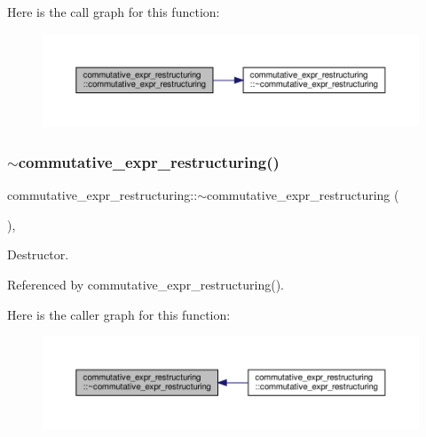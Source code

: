 Here is the call graph for this function\+:
\nopagebreak
\begin{figure}[H]
\begin{center}
\leavevmode
\includegraphics[width=350pt]{db/d8c/classcommutative__expr__restructuring_aa4c5653385cc2917ada9cf5ee3936cd3_cgraph}
\end{center}
\end{figure}
\mbox{\label{classcommutative__expr__restructuring_a7d25b3a3c5ecbc43890f7cc8613bd9f9}} 
\subsubsection{\texorpdfstring{$\sim$commutative\+\_\+expr\+\_\+restructuring()}{~commutative\_expr\_restructuring()}}
{\footnotesize\ttfamily commutative\+\_\+expr\+\_\+restructuring\+::$\sim$commutative\+\_\+expr\+\_\+restructuring (\begin{DoxyParamCaption}{ }\end{DoxyParamCaption})\hspace{0.3cm}{\ttfamily [override]}, {\ttfamily [default]}}



Destructor. 



Referenced by commutative\+\_\+expr\+\_\+restructuring().

Here is the caller graph for this function\+:
\nopagebreak
\begin{figure}[H]
\begin{center}
\leavevmode
\includegraphics[width=350pt]{db/d8c/classcommutative__expr__restructuring_a7d25b3a3c5ecbc43890f7cc8613bd9f9_icgraph}
\end{center}
\end{figure}


